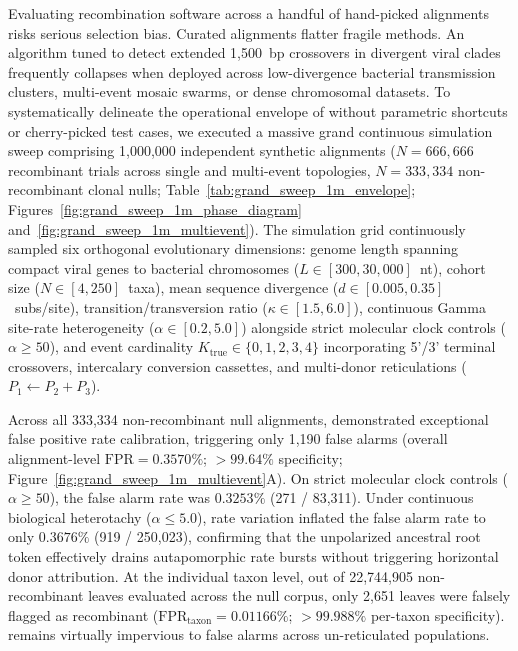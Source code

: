 Evaluating recombination software across a handful of hand-picked alignments risks serious selection bias.
Curated alignments flatter fragile methods.
An algorithm tuned to detect extended 1,500~bp crossovers in divergent viral clades frequently collapses when deployed across low-divergence bacterial transmission clusters, multi-event mosaic swarms, or dense chromosomal datasets.
To systematically delineate the operational envelope of \RhizAeon without parametric shortcuts or cherry-picked test cases, we executed a massive grand continuous simulation sweep comprising 1,000,000 independent synthetic alignments ($N = 666{,}666$ recombinant trials across single and multi-event topologies, $N = 333{,}334$ non-recombinant clonal nulls; Table~\ref{tab:grand_sweep_1m_envelope}; Figures~\ref{fig:grand_sweep_1m_phase_diagram} and~\ref{fig:grand_sweep_1m_multievent}).
The simulation grid continuously sampled six orthogonal evolutionary dimensions: genome length spanning compact viral genes to bacterial chromosomes ($L \in [300, 30{,}000]$~nt), cohort size ($N \in [4, 250]$~taxa), mean sequence divergence ($d \in [0.005, 0.35]$~subs/site), transition/transversion ratio ($\kappa \in [1.5, 6.0]$), continuous Gamma site-rate heterogeneity ($\alpha \in [0.2, 5.0]$) alongside strict molecular clock controls ($\alpha \ge 50$), and event cardinality $K_{\mathrm{true}} \in \{0, 1, 2, 3, 4\}$ incorporating 5'/3' terminal crossovers, intercalary conversion cassettes, and multi-donor reticulations ($P_1 \leftarrow P_2 + P_3$).



Across all 333,334 non-recombinant null alignments, \RhizAeon demonstrated exceptional false positive rate calibration, triggering only 1,190 false alarms (overall alignment-level $\text{FPR} = 0.3570\%$; $>99.64\%$ specificity; Figure~\ref{fig:grand_sweep_1m_multievent}A).
On strict molecular clock controls ($\alpha \ge 50$), the false alarm rate was $0.3253\%$ (271 / 83,311).
Under continuous biological heterotachy ($\alpha \le 5.0$), rate variation inflated the false alarm rate to only $0.3676\%$ (919 / 250,023), confirming that the unpolarized ancestral root token effectively drains autapomorphic rate bursts without triggering horizontal donor attribution.
At the individual taxon level, out of 22,744,905 non-recombinant leaves evaluated across the null corpus, only 2,651 leaves were falsely flagged as recombinant ($\text{FPR}_{\text{taxon}} = 0.01166\%$; $>99.988\%$ per-taxon specificity).
\RhizAeon remains virtually impervious to false alarms across un-reticulated populations.

